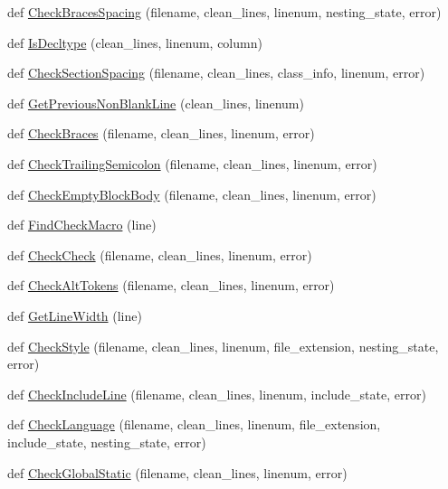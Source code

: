 \begin{DoxyCompactItemize}
def \hyperlink{namespacecpplint_a205bb76a59359eb1c0be86567bbc5256}{Check\+Braces\+Spacing} (filename, clean\+\_\+lines, linenum, nesting\+\_\+state, error)
\item 
def \hyperlink{namespacecpplint_a6e55ab13af2fa8b8e1f50e09aed592b8}{Is\+Decltype} (clean\+\_\+lines, linenum, column)
\item 
def \hyperlink{namespacecpplint_abc4e2f3f48debd6ae3a9561d052a955b}{Check\+Section\+Spacing} (filename, clean\+\_\+lines, class\+\_\+info, linenum, error)
\item 
def \hyperlink{namespacecpplint_a27743480b080a71eb8a0320da2ca0fa3}{Get\+Previous\+Non\+Blank\+Line} (clean\+\_\+lines, linenum)
\item 
def \hyperlink{namespacecpplint_a3f0a4d2ab1846bf487c742dc88946e3e}{Check\+Braces} (filename, clean\+\_\+lines, linenum, error)
\item 
def \hyperlink{namespacecpplint_a725663cb5a341fbf726f2ac8fa4e61a3}{Check\+Trailing\+Semicolon} (filename, clean\+\_\+lines, linenum, error)
\item 
def \hyperlink{namespacecpplint_a9c8aa68644d8cb55497a7d9cb8fb12d1}{Check\+Empty\+Block\+Body} (filename, clean\+\_\+lines, linenum, error)
\item 
def \hyperlink{namespacecpplint_aefff9c2eefe99656a226d11ce4d9b555}{Find\+Check\+Macro} (line)
\item 
def \hyperlink{namespacecpplint_afc5b544f640cd11be2665e6bb4646de7}{Check\+Check} (filename, clean\+\_\+lines, linenum, error)
\item 
def \hyperlink{namespacecpplint_a47f66a697e177c06b56491613fbc2d38}{Check\+Alt\+Tokens} (filename, clean\+\_\+lines, linenum, error)
\item 
def \hyperlink{namespacecpplint_ae55f74f34d41b59cf262511c5944209a}{Get\+Line\+Width} (line)
\item 
def \hyperlink{namespacecpplint_acfc546daa5947842cb01af319dcb482b}{Check\+Style} (filename, clean\+\_\+lines, linenum, file\+\_\+extension, nesting\+\_\+state, error)
\item 
def \hyperlink{namespacecpplint_add7eb8486a182205bb86de635db01384}{Check\+Include\+Line} (filename, clean\+\_\+lines, linenum, include\+\_\+state, error)
\item 
def \hyperlink{namespacecpplint_a6992d951cf4be06500f6b392ee6a8111}{Check\+Language} (filename, clean\+\_\+lines, linenum, file\+\_\+extension, include\+\_\+state, nesting\+\_\+state, error)
\item 
def \hyperlink{namespacecpplint_a64fc322bcf08988b43f003ff495fbabb}{Check\+Global\+Static} (filename, clean\+\_\+lines, linenum, error)

\end{DoxyCompactItemize}
